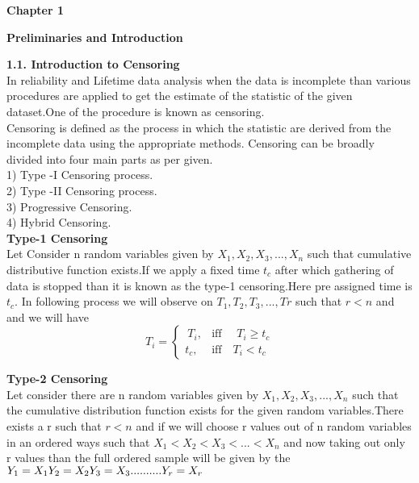 \documentclass[12pt]{article}
\begin{document}
\newpage
\setcounter{page}{1}
\vspace{0.5cm}
\begin{flushleft}
\textbf{\Large Chapter 1}
\end{flushleft}
\vspace{0.1cm}
\begin{flushleft}
\textbf{\Large Preliminaries and Introduction}
\end{flushleft}
\vspace{0.2cm}
\noindent \textbf{\large 1.1. Introduction to Censoring}\\
\vspace{0.2cm}
In reliability and Lifetime data analysis when the data is incomplete than various procedures are applied to get the estimate of the statistic of the given dataset.One of the procedure is known as censoring.\\
Censoring is defined as the process in which the statistic are derived from the incomplete data using the appropriate methods. Censoring can be broadly divided into four main parts as per given.\\
1) Type -I Censoring process.\\
2) Type -II Censoring process.\\
3) Progressive Censoring.\\
4) Hybrid Censoring.\\

\textbf{Type-1 Censoring}\\
 \quad Let Consider n random variables given by $X_{1},X_{2},X_{3},...,X_{n}$ such that cumulative distributive function exists.If we apply a fixed time $t_{c}$ after which gathering of data is stopped  than it is known as the type-1 censoring.Here pre assigned time is $t_{c}$.
 In following process we will observe on $ T_{1},T_{2},T_{3},...,T{r}$ such that $r<n$ and
 and we will have
\[
T_{i}= 
\begin{cases}
\   T_{i},       & \text{iff }\quad T_{i}\geq t_{c}\\
    t_c,         & \text{iff}\quad T_{i}< t_{c}
\end{cases}
\]

\textbf{Type-2 Censoring}\\
 \quad Let consider there are n random variables given by $X_{1},X_{2},X_{3},...,X_{n}$
 such that the cumulative distribution function exists for the given random variables.There exists a r such that $r<n $ and if we will choose r values out of n  random variables in an ordered ways such that $X_{1}<X_{2}<X_{3}<...<X_{n}$ and
 now taking out only r values than the full ordered sample will be given by the\\
 $
 Y_{1}=X_{1}\\
 Y_{2}=X_{2}\\
 Y_{3}=X_{3}\\
  ..........\\
 Y_{r}=X_{r}\\
 $
 
\end{document}
